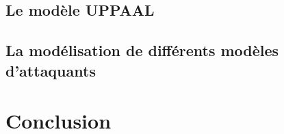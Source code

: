 \documentclass[10pt,a4paper]{article}
\begin{document}
\subsection{Le modèle UPPAAL}



\subsection{La modélisation de différents modèles d'attaquants}


\section{Conclusion}
\newpage


\end{document}
